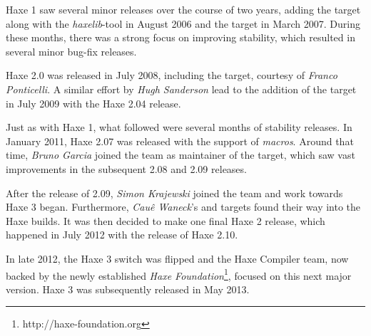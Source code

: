 Haxe 1 saw several minor releases over the course of two years, adding the  target along with the \emph{haxelib}-tool in August 2006 and the  target in March 2007. During these months, there was a strong focus on improving stability, which resulted in several minor bug-fix releases.

Haxe 2.0 was released in July 2008, including the  target, courtesy of \emph{Franco Ponticelli}. A similar effort by \emph{Hugh Sanderson} lead to the addition of the  target in July 2009 with the Haxe 2.04 release.

Just as with Haxe 1, what followed were several months of stability releases. In January 2011, Haxe 2.07 was released with the support of \emph{macros}. Around that time, \emph{Bruno Garcia} joined the team as maintainer of the  target, which saw vast improvements in the subsequent 2.08 and 2.09 releases.

After the release of 2.09, \emph{Simon Krajewski} joined the team and work towards Haxe 3 began. Furthermore, \emph{Cau\^{e} Waneck}'s  and  targets found their way into the Haxe builds. It was then decided to make one final Haxe 2 release, which happened in July 2012 with the release of Haxe 2.10.

In late 2012, the Haxe 3 switch was flipped and the Haxe Compiler team, now backed by the newly established \emph{Haxe Foundation}\footnote{http://haxe-foundation.org}, focused on this next major version. Haxe 3 was subsequently released in May 2013.
